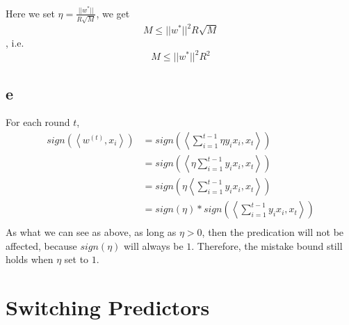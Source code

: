 \documentclass{article}
\begin{document}
	Here we set $\eta = \frac{||w^*||}{R\sqrt{M}}$, we get
	\begin{equation}
	M \leq ||w^*||^2R\sqrt{M}
	\label{eq20}
	\end{equation}
	, i.e.
	\begin{equation}
	M \leq ||w^*||^2R^2
	\label{eq21}
	\end{equation}

	\subsection{e}
	For each round $t$,
	\begin{equation}
	\begin{aligned}
	sign(\left<w^{(t)},x_i\right>)&=sign(\left<\sum_{i=1}^{t-1}\eta y_ix_i,x_t\right>)\\
	&=sign(\left<\eta\sum_{i=1}^{t-1}y_ix_i,x_t\right>)\\
	&=sign(\eta\left<\sum_{i=1}^{t-1}y_ix_i,x_t\right>)\\
	&=sign(\eta)*sign(\left<\sum_{i=1}^{t-1}y_ix_i,x_t\right>)\\
	\end{aligned}
	\label{eq22}
	\end{equation}
	As what we can see as above, as long as $\eta>0$, then the predication will not be affected, because $sign(\eta)$ will always be $1$. Therefore, the mistake bound still holds when $\eta$ set to $1$.


	\section{Switching Predictors}
\end{document}
